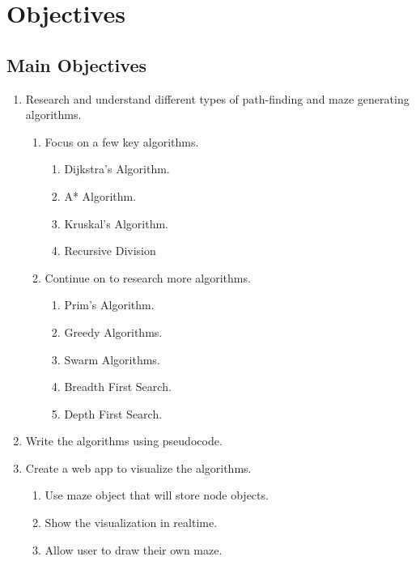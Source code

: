 \documentclass{article}
\begin{document}
\section{Objectives}
\subsection{Main Objectives}
\begin{enumerate}
    \item Research and understand different types of path-finding and maze generating algorithms.
    \begin{enumerate}
        \item Focus on a few key algorithms.
        \begin{enumerate}
            \item Dijkstra's Algorithm.
            \item A* Algorithm.
            \item Kruskal's Algorithm.
            \item Recursive Division
        \end{enumerate}
        \item Continue on to research more algorithms.
        \begin{enumerate}
            \item Prim's Algorithm.
            \item Greedy Algorithms.
            \item Swarm Algorithms.
            \item Breadth First Search.
            \item Depth First Search.
        \end{enumerate}
    \end{enumerate}
    
    \item Write the algorithms using pseudocode.
    \item Create a web app to visualize the algorithms. \cite{example}
    \begin{enumerate}
        \item Use maze object that will store node objects.
        \item Show the visualization in realtime.
        \item Allow user to draw their own maze.
    \end{enumerate}
\end{enumerate}
\end{document}
